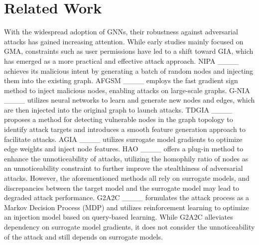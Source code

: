 \section{Related Work}
With the widespread adoption of GNNs, their robustness against adversarial attacks has gained increasing attention. While early studies mainly focused on GMA, constraints such as user permissions have led to a shift toward GIA, which has emerged as a more practical and effective attack approach. NIPA ____ achieves its malicious intent by generating a batch of random nodes and injecting them into the existing graph. AFGSM ____ employs the fast gradient sign method to inject malicious nodes, enabling attacks on large-scale graphs. G-NIA ____ utilizes neural networks to learn and generate new nodes and edges, which are then injected into the original graph to launch attacks. TDGIA ____ proposes a method for detecting vulnerable nodes in the graph topology to identify attack targets and introduces a smooth feature generation approach to facilitate attacks. AGIA ____ utilizes surrogate model gradients to optimize edge weights and inject node features. HAO ____ offers a plug-in method to enhance the unnoticeability of attacks, utilizing the homophily ratio of nodes as an unnoticeability constraint to further improve the stealthiness of adversarial attacks. However, the aforementioned methods all rely on surrogate models, and discrepancies between the target model and the surrogate model may lead to degraded attack performance. G2A2C ____ formulates the attack process as a Markov Decision Process (MDP) and utilizes reinforcement learning to optimize an injection model based on query-based learning. While G2A2C alleviates dependency on surrogate model gradients, it does not consider the unnoticeability of the attack and still depends on surrogate models.